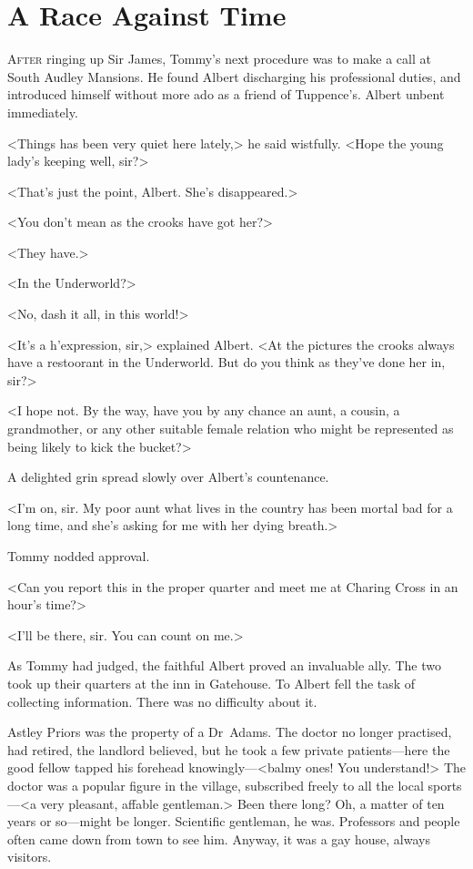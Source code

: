 \chapter{A Race Against Time} 

 \lettrine{A}{fter} ringing up Sir James, Tommy's next procedure was to make a call at South Audley Mansions. He found Albert discharging his professional duties, and introduced himself without more ado as a friend of Tuppence's. Albert unbent immediately.

<Things has been very quiet here lately,> he said wistfully. <Hope the young lady's keeping well, sir?>

<That's just the point, Albert. She's disappeared.>

<You don't mean as the crooks have got her?>

<They have.>

<In the Underworld?>

<No, dash it all, in this world!>

<It's a h'expression, sir,> explained Albert. <At the pictures the crooks always have a restoorant in the Underworld. But do you think as they've done her in, sir?>

<I hope not. By the way, have you by any chance an aunt, a cousin, a grandmother, or any other suitable female relation who might be represented as being likely to kick the bucket?>

A delighted grin spread slowly over Albert's countenance.

<I'm on, sir. My poor aunt what lives in the country has been mortal bad for a long time, and she's asking for me with her dying breath.>

Tommy nodded approval.

<Can you report this in the proper quarter and meet me at Charing Cross in an hour's time?>

<I'll be there, sir. You can count on me.>

As Tommy had judged, the faithful Albert proved an invaluable ally. The two took up their quarters at the inn in Gatehouse. To Albert fell the task of collecting information. There was no difficulty about it.

Astley Priors was the property of a Dr~Adams. The doctor no longer practised, had retired, the landlord believed, but he took a few private patients—here the good fellow tapped his forehead knowingly—<balmy ones! You understand!> The doctor was a popular figure in the village, subscribed freely to all the local sports—<a very pleasant, affable gentleman.> Been there long? Oh, a matter of ten years or so—might be longer. Scientific gentleman, he was. Professors and people often came down from town to see him. Anyway, it was a gay house, always visitors.

